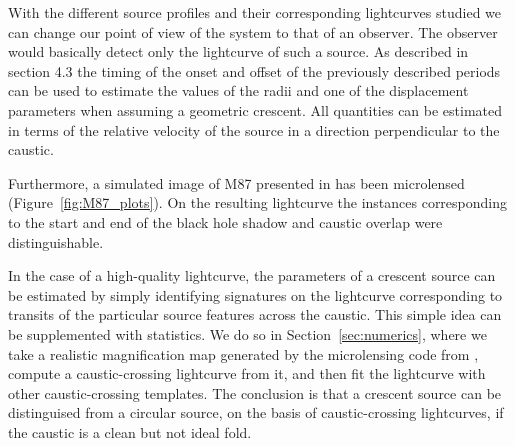 \documentclass[usenatbib]{mn2e}
\begin{document}
With the different source profiles and their corresponding lightcurves 
studied we can change our point of view of the system to that of an observer. 
The observer would basically detect only the lightcurve of such a source.
 As described in section 4.3 the timing of the onset and 
offset of the previously 
described periods can be used to estimate the values of the radii 
and one of the displacement parameters when assuming a geometric crescent. 
All quantities can be estimated in terms of the relative velocity 
of the source in a direction perpendicular to the caustic.


Furthermore, a simulated image of M87 presented in
\cite{2012MNRAS.421.1517D} has been microlensed
(Figure~\ref{fig:M87_plots}).  On the resulting lightcurve the
instances corresponding to the start and end of the black hole shadow
and caustic overlap were distinguishable.
    
In the case of a high-quality lightcurve, the parameters of a crescent
source can be estimated by simply identifying signatures on the
lightcurve corresponding to transits of the particular source features
across the caustic.  This simple idea can be supplemented with
statistics.  We do so in Section~\ref{sec:numerics}, where we take a
realistic magnification map generated by the microlensing code
from \cite{1999A&A...346L...5W}, compute a caustic-crossing lightcurve
from it, and then fit the lightcurve with other caustic-crossing
templates.  The conclusion is that a crescent source can be
distinguised from a circular source, on the basis of caustic-crossing
lightcurves, if the caustic is a clean but not ideal fold.
\end{document}
